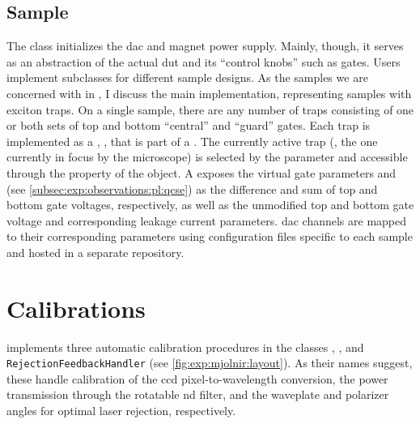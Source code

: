 \subsection{Sample}\label{subsec:exp:mjolnir:logical_instruments:sam}
The  class initializes the \qdac \gls{dac} and magnet power supply.
Mainly, though, it serves as an abstraction of the actual \gls{dut} and its \enquote{control knobs} such as gates.
Users implement subclasses for different sample designs.
As the samples we are concerned with in \thethesis, I discuss the main implementation,  representing samples with exciton traps.
On a single sample, there are any number of traps consisting of one or both sets of top and bottom \enquote{central} and \enquote{guard} gates.
Each trap is implemented as a \qcodes {}, , that is part of a .
The currently active trap (\ie, the one currently in focus by the microscope) is selected by the  parameter and accessible through the  property of the  object.
A  exposes the virtual gate parameters
 and  (see \cref{subsec:exp:observations:pl:qcse}) as the difference and sum of top and bottom gate voltages, respectively, as well as the unmodified top and bottom gate voltage and corresponding leakage current parameters.
\Gls{dac} channels are mapped to their corresponding  parameters using  configuration files specific to each sample and hosted in a separate repository.

\section{Calibrations}\label{sec:exp:mjolnir:calibration}
\mjolnir implements three automatic calibration procedures in the classes , , and \texttt{RejectionFeedbackHandler} (see \cref{fig:exp:mjolnir:layout}).
As their names suggest, these handle calibration of the \gls{ccd} pixel-to-wavelength conversion, the power transmission through the rotatable \gls{nd} filter, and the waveplate and polarizer angles for optimal laser rejection, respectively.

